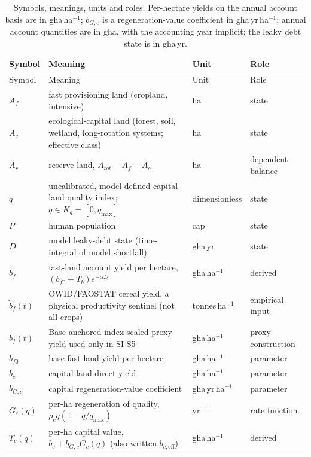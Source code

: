 \documentclass[11pt,a4paper]{article}
\newcommand{\Ups}{\Upsilon_c}
\begin{document}
\begin{longtable}{>{\raggedright\arraybackslash}p{}>{\raggedright\arraybackslash}p{}>{\raggedright\arraybackslash}p{}>{\raggedright\arraybackslash}p{}}
\caption{Symbols, meanings, units and roles. Per-hectare yields on the annual account basis are in gha\,ha$^{-1}$; $b_{G,c}$ is a regeneration-value coefficient in gha\,yr\,ha$^{-1}$; annual account quantities are in gha, with the accounting year implicit; the leaky debt state is in gha\,yr.}\label{tab:si_symbols}\\
\toprule
Symbol & Meaning & Unit & Role \\
\midrule
\endfirsthead
\toprule
Symbol & Meaning & Unit & Role \\
\midrule
\endhead
$A_f$ & fast provisioning land (cropland, intensive) & ha & state \\
$A_c$ & ecological-capital land (forest, soil, wetland, long-rotation systems; effective class) & ha & state \\
$A_r$ & reserve land, $A_{tot}-A_f-A_c$ & ha & dependent balance \\
$q$ & uncalibrated, model-defined capital-land quality index; $q\in K_q=[0,q_{\max}]$ & dimensionless & state \\
$P$ & human population & cap & state \\
$D$ & model leaky-debt state (time-integral of model shortfall) & gha\,yr & state \\
$b_f$ & fast-land account yield per hectare, $(b_{f0}+T_b)e^{-\alpha D}$ & gha\,ha$^{-1}$ & derived \\
$\tilde b_f(t)$ & OWID/FAOSTAT cereal yield, a physical productivity sentinel (not all crops) & tonnes\,ha$^{-1}$ & empirical input \\
$\hat b_f(t)$ & Base-anchored index-scaled proxy yield used only in SI S5 & gha\,ha$^{-1}$ & proxy construction \\
$b_{f0}$ & base fast-land yield per hectare & gha\,ha$^{-1}$ & parameter \\
$b_c$ & capital-land direct yield & gha\,ha$^{-1}$ & parameter \\
$b_{G,c}$ & capital regeneration-value coefficient & gha\,yr\,ha$^{-1}$ & parameter \\
$G_c(q)$ & per-ha regeneration of quality, $\rho_cq(1-q/q_{\max})$ & yr$^{-1}$ & rate function \\
$\Ups(q)$ & per-ha capital value, $b_c+b_{G,c}G_c(q)$ (also written $b_{c,\mathrm{eff}}$) & gha\,ha$^{-1}$ & derived \\

\end{longtable}
\end{document}
